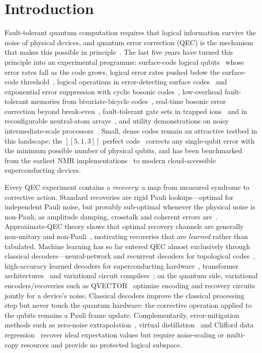 \documentclass[aps,prxquantum,reprint,superscriptaddress]{revtex4-2}
\newcommand{\code}{[\![5,1,3]\!]}
\begin{document}
\section*{Introduction}

Fault-tolerant quantum computation requires that logical information survive the noise of physical devices, and quantum error correction (QEC) is the
mechanism that makes this possible in principle~\cite{shor_code,steane_code,
knill_theory}. The last five years have turned this principle into an
experimental programme: surface-code logical qubits~\cite{fowler_surface,
google_scaling} whose error rates fall as
the code grows, logical error rates pushed below the surface-code
threshold~\cite{google_below_threshold}, logical operations in
error-detecting surface codes~\cite{marques_d3} and exponential error
suppression with cyclic bosonic codes~\cite{google_cyclic}, low-overhead
fault-tolerant memories from bivariate-bicycle codes~\cite{bravyi_bb},
real-time bosonic error correction beyond break-even~\cite{sivak_breakeven,
brock_qudits}, fault-tolerant gate sets in trapped
ions~\cite{ryan_anderson_rt,postler_ft,honciuc_832} and in reconfigurable
neutral-atom arrays~\cite{bluvstein_atoms}, and utility demonstrations on
noisy intermediate-scale processors~\cite{ibm_utility}. Small, dense codes
remain an attractive testbed in this landscape: the $\code$ perfect
code~\cite{laflamme_5q,gottesman_hamming} corrects any single-qubit error with
the minimum possible number of physical qubits, and has been benchmarked from
the earliest NMR implementations~\cite{knill_bench5q,zhang_nmr5q} to modern
cloud-accessible superconducting devices.

Every QEC experiment contains a \emph{recovery}: a map from measured syndrome
to corrective action. Standard recoveries are rigid Pauli lookups---optimal
for independent Pauli noise, but provably sub-optimal whenever the physical
noise is non-Pauli, as amplitude damping, crosstalk and coherent errors
are~\cite{knill_theory,beny_optimal,petz_map}. Approximate-QEC theory shows
that optimal recovery channels are generally non-unitary and
non-Pauli~\cite{petz_map,beny_optimal}, motivating recoveries that are
\emph{learned} rather than tabulated. Machine learning has so far entered QEC
almost exclusively through classical decoders---neural-network and
recurrent decoders for topological
codes~\cite{torlai_nn,baireuther_njp,meinerz_nn,wang_nn_boson},
high-accuracy learned decoders for superconducting
hardware~\cite{bausch_ml}, transformer architectures~\cite{tian_transformer}
and variational circuit compilers~\cite{xu_vcc}; on the quantum side,
variational encoders/recoveries such as QVECTOR~\cite{johnson_qvector}
optimize encoding and recovery circuits jointly for a device's noise.
Classical decoders improve the
classical processing step but never touch the quantum hardware: the
corrective operation applied to the qubits remains a Pauli frame update.
Complementarily, error-mitigation methods such as zero-noise
extrapolation~\cite{temme_zne,endo_zne,kandala_zne_hw}, virtual
distillation~\cite{huggins_vd,vikstal_vd} and Clifford data
regression~\cite{czarnik_cdr,cai_em_review} recover ideal expectation values
but require noise-scaling or multi-copy resources and provide no protected
logical subspace.
\end{document}
